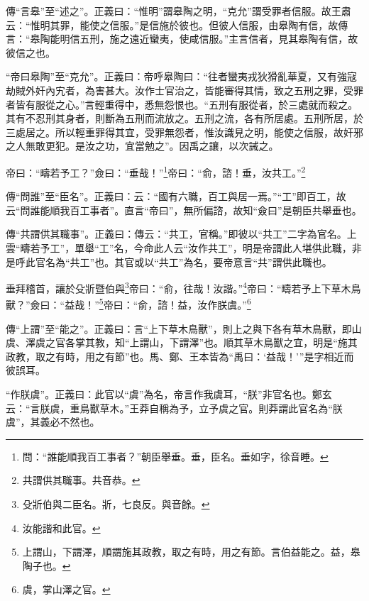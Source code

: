 {\noindent\zhuan{}\fzbyks 傳“言皋”至“述之”。正義曰：“惟明”謂皋陶之明，“克允”謂受罪者信服。故王肅云：“惟明其罪，能使之信服。”是信施於彼也。但彼人信服，由皋陶有信，故傳言：“皋陶能明信五刑，施之遠近蠻夷，使咸信服。”主言信者，見其皋陶有信，故彼信之也。 \par}

{\noindent\shu{}\fzkt “帝曰皋陶”至“克允”。正義曰：帝呼皋陶曰：“往者蠻夷戎狄猾亂華夏，又有強寇劫賊外奸內宄者，為害甚大。汝作士官治之，皆能審得其情，致之五刑之罪，受罪者皆有服從之心。”言輕重得中，悉無怨恨也。“五刑有服從者，於三處就而殺之。其有不忍刑其身者，則斷為五刑而流放之。五刑之流，各有所居處。五刑所居，於三處居之。所以輕重罪得其宜，受罪無怨者，惟汝識見之明，能使之信服，故奸邪之人無敢更犯。是汝之功，宜當勉之”。因禹之讓，以次誡之。 \par}

帝曰：“疇若予工？”僉曰：“垂哉！”\footnote{問：“誰能順我百工事者？”朝臣舉垂。垂，臣名。垂如字，徐音睡。}帝曰：“俞，諮！垂，汝共工。”\footnote{共謂供其職事。共音恭。}

{\noindent\zhuan{}\fzbyks 傳“問誰”至“臣名”。正義曰：云：“國有六職，百工與居一焉。”“工”即百工，故云“問誰能順我百工事者”。直言“帝曰”，無所偏諮，故知“僉曰”是朝臣共舉垂也。 \par}

{\noindent\zhuan{}\fzbyks 傳“共謂供其職事”。正義曰：傳云：“共工，官稱。”即彼以“共工”二字為官名。上雲“疇若予工”，單舉“工”名，今命此人云“汝作共工”，明是帝謂此人堪供此職，非是呼此官名為“共工”也。其官或以“共工”為名，要帝意言“共”謂供此職也。 \par}

垂拜稽首，讓於殳斨暨伯與\footnote{殳斨伯與二臣名。斨，七良反。與音餘。}帝曰：“俞，往哉！汝諧。”\footnote{汝能諧和此官。}帝曰：“疇若予上下草木鳥獸？”僉曰：“益哉！”\footnote{上謂山，下謂澤，順謂施其政教，取之有時，用之有節。言伯益能之。益，皋陶子也。}帝曰：“俞，諮！益，汝作朕虞。”\footnote{虞，掌山澤之官。}

{\noindent\zhuan{}\fzbyks 傳“上謂”至“能之”。正義曰：言“上下草木鳥獸”，則上之與下各有草木鳥獸，即山虞、澤虞之官各掌其教，知“上謂山，下謂澤”也。順其草木鳥獸之宜，明是“施其政教，取之有時，用之有節”也。馬、鄭、王本皆為“禹曰：‘益哉！’”是字相近而彼誤耳。 \par}

{\noindent\zhuan{}\fzbyks “作朕虞”。正義曰：此官以“虞”為名，帝言作我虞耳，“朕”非官名也。鄭玄云：“言朕虞，重鳥獸草木。”王莽自稱為予，立予虞之官。則莽謂此官名為“朕虞”，其義必不然也。 \par}

